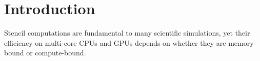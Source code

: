 \section{Introduction}
Stencil computations are fundamental to many scientific simulations, yet their efficiency on multi-core CPUs and GPUs depends on whether they are memory-bound or compute-bound. 
